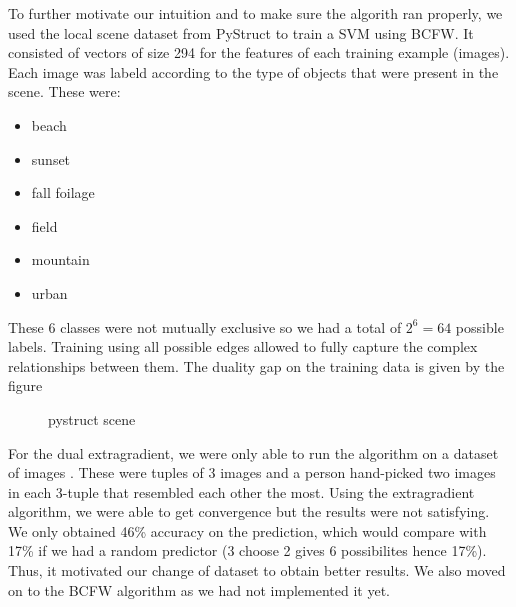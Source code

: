 To further motivate our intuition and to make sure the algorith ran properly, we used
the local scene dataset \cite{JMLR:v15:mueller14a} from PyStruct to train a SVM using BCFW. It consisted of vectors
of size 294 for the features of each training example (images). Each image was labeld according
to the type of objects that were present in the scene. These were:
\begin{itemize}
  \item beach
  \item sunset
  \item fall foilage
  \item field
  \item mountain
  \item urban
\end{itemize}
These 6 classes were not mutually exclusive so we had a total of $2^6=64$
possible labels. Training using all possible edges allowed to fully capture the
complex relationships between them. The duality gap on the training data is
given by the figure

\begin{figure}[htbp!]
  \caption{pystruct scene}
\end{figure} 


For the dual extragradient, we were only able to run the algorithm on a dataset
of images \citet{vemulapalliCompactEmbeddingFacial2018}. These were tuples of 3 images and a person
hand-picked two images in each 3-tuple that resembled each other the most. Using the
extragradient algorithm, we were able to get convergence but the results were not 
satisfying. We only obtained 46\% accuracy on the prediction, which would compare 
with 17\% if we had a random predictor (3 choose 2 gives 6 possibilites hence 17\%).
Thus, it motivated our change of dataset to obtain better results. We also moved on to
the BCFW algorithm as we had not implemented it yet.


